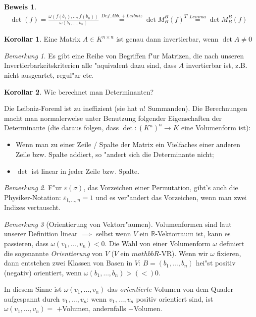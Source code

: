 \documentclass[oneside,fontsize=11pt,paper=a4,BCOR=0mm,DIV=12,automark,headsepline]{scrbook}
\theoremstyle{remark}
\theoremstyle{definition}
\newtheorem*{korollar}{Korollar}
\theoremstyle{definition}
\newtheorem*{prof}{Beweis}
\theoremstyle{remark}
\newtheorem*{bem}{Bemerkung}
\begin{document}
\begin{prof}
  \begin{align*}
    \det(f) = \frac{\omega(f(b_1),\dots,f(b_n))}{\omega(b_1,\dots,b_n)} \stackrel{Def. Abb. + Leibniz}{=} \det M^B_B(f)^T \stackrel{Lemma}{=} \det M_B^B(f)
  \end{align*}
\end{prof}
\begin{korollar}
  Eine Matrix \(A\in K^{n\times n} \) ist genau dann invertierbar, wenn \(\det A \neq 0 \)
\end{korollar}
\begin{bem}
  Es gibt eine Reihe von Begriffen f"ur Matrizen, die nach unseren Invertierbarkeitskriterien alle "aquivalent dazu sind, dass \(A \) invertierbar ist, z.B. nicht ausgeartet, regul"ar etc.
\end{bem}
\begin{korollar}
  Wie berechnet man Determinanten?

  Die Leibniz-Foreml ist zu ineffizient (sie hat \(n!\) Summanden). Die Berechnungen macht man normalerweise unter Benutzung folgender Eigenschaften der Determinante (die daraus folgen, dass \(\det : (K^n)^n \to K\) eine Volumenform ist):
  \begin{itemize}
  \item Wenn man zu einer Zeile / Spalte der Matrix ein Vielfaches einer anderen Zeile bzw. Spalte addiert, so "andert sich die Determinante nicht;
  \item \(\det \) ist linear in jeder Zeile bzw. Spalte.
  \end{itemize}
\end{korollar}
\begin{bem}
  F"ur \(\varepsilon(\sigma)\), das Vorzeichen einer Permutation, gibt's auch die Physiker-Notation: \(\varepsilon_{1,\dots,n}=1\) und es ver"andert das Vorzeichen, wenn man zwei Indizes vertauscht.
\end{bem}
\begin{bem}[Orientierung von Vektorr"aumen]
  Volumenformen sind laut unserer Definition linear \(\implies\) selbst wenn \(V\) ein \(\mathbb{R}\)-Vektorraum ist, kann es passieren, dass \(\omega(v_1,\dots,v_n)< 0\). Die Wahl von einer Volumenform \(\omega\) definiert die sogenannte \emph{Orientierung} von \(V\) (\(V\) ein \(mathbb{R}\)-VR). Wenn wir \(\omega\) fixieren, dann entstehen zwei Klassen von Basen in \(V\): \(B = (b_1,\dots,b_n)\) hei"st positiv (negativ) orientiert, wenn \(\omega(b_1,\dots,b_n) > (<) 0\). 
  
  In diesem Sinne ist \(\omega(v_1,\dots,v_n)\) das \emph{orientierte} Volumen von dem Quader aufgespannt durch \(v_1,\dots,v_n\): wenn \(v_1,\dots,v_n\) positiv orientiert sind, ist \(\omega(v_1,\dots,v_n) = \) \(+\)Volumen, andernfalls \(-\)Volumen.
\end{bem}
\end{document}
